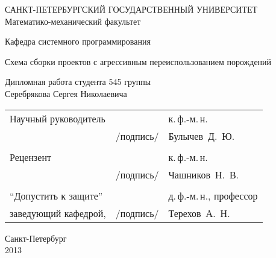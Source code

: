 %
%
\thispagestyle{empty}
\begin{center}
САНКТ-ПЕТЕРБУРГСКИЙ ГОСУДАРСТВЕННЫЙ УНИВЕРСИТЕТ\\
Математико-механический факультет\\
\end{center}

\begin{center}
Кафедра системного программирования\\
\end{center}
\vspace{2cm}
\begin{center}
    \LARGE{Схема сборки проектов с агрессивным переиспользованием порождений} \\
\end{center}
\vspace{1cm}
\begin{center}
    \normalsize{Дипломная работа студента 545 группы} \\
    \large{Серебрякова Сергея Николаевича}
\end{center}
\vspace{3cm}
\noindent
\begin{center}
    \small
    \begin{tabular}{lcl}
        Научный руководитель & \dotuline{\phantom{место для подписи}} & к.\,ф.-м.\,н.\\
        & /подпись/ & Булычев~Д.~Ю.\\\\
        Рецензент & \dotuline{\phantom{место для подписи}} & к.\,ф.-м.\,н.\\
        & /подпись/& Чашников~Н.~В.\\\\
        ``Допустить к защите'' & \dotuline{\phantom{место для подписи}} & д.\,ф.-м.\,н., профессор\\
        заведующий кафедрой, & /подпись/& Терехов~А.~Н.\\
    \end{tabular}
\end{center}
\vspace{\fill}
\begin{center}
    \small
    Санкт-Петербург\\2013
\end{center}
